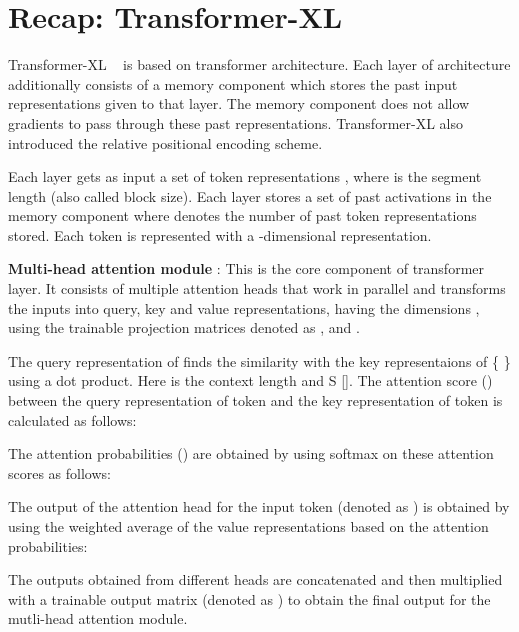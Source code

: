 \documentclass[11pt]{article}
\begin{document}





\appendix

\section{Recap: Transformer-XL}
\label{appendix:recap_txl}


Transformer-XL ~\citep{DBLP:conf/acl/DaiYYCLS19} is based on transformer architecture. Each layer of  architecture additionally consists of a memory component which stores the past input representations given to that layer. The memory component does not allow gradients to pass through these past representations. Transformer-XL also introduced the relative positional encoding scheme.




Each layer gets as input a set of token representations , where  is the segment length (also called block size). Each layer stores a set of past activations  in the memory component where   denotes the number of past token representations stored. Each token is represented with a -dimensional representation.



\textbf{Multi-head attention module} : This is the core component of transformer layer. It consists of multiple attention heads that work in parallel and transforms the inputs into query, key and value representations, having the dimensions , using the trainable projection matrices denoted as ,  and   .


The query representation of  finds the similarity with the key representaions of \{ \} using a dot product. Here  is the context length and S []. The attention score () between the query representation of  token and the key representation of  token is calculated as follows:

   

The attention probabilities () are obtained by using softmax on these attention scores as follows:


The output of the attention head for the  input token (denoted as ) is obtained by using the weighted average of the value representations based on the attention probabilities:

The outputs obtained from different heads are concatenated and then multiplied with a trainable output matrix (denoted as )  to obtain the final output for the mutli-head attention module.
\end{document}
